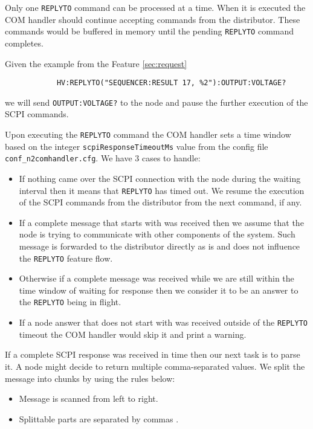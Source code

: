 \begin{itemize}
	\item Only one \texttt{REPLYTO} command can be processed at a time. When it is executed the COM handler should continue accepting commands from the distributor. These commands would be buffered in memory until the pending \texttt{REPLYTO} command completes.
	\item{
		Given the example from the Feature \ref{sec:request}
		\begin{verbatim}
			HV:REPLYTO("SEQUENCER:RESULT 17, %2"):OUTPUT:VOLTAGE?
		\end{verbatim}
		we will send \texttt{OUTPUT:VOLTAGE?} to the node and pause the further execution of the SCPI commands.
	}
	\item{
		Upon executing the \texttt{REPLYTO} command the COM handler sets a time window based on the integer \texttt{scpiResponseTimeoutMs} value from the config file \texttt{conf\_n2comhandler.cfg}. We have 3 cases to handle:
		\begin{itemize}
			\item If nothing came over the SCPI connection with the node during the waiting interval then it means that \texttt{REPLYTO} has timed out. We resume the execution of the SCPI commands from the distributor from the next command, if any.
			\item If a complete message that starts with \highlight{:} was received then we assume that the node is trying to communicate with other components of the system. Such message is forwarded to the distributor directly as is and does not influence the \texttt{REPLYTO} feature flow.
			\item Otherwise if a complete message was received while we are still within the time window of waiting for response then we consider it to be an answer to the \texttt{REPLYTO} being in flight.
			\item If a node answer that does not start with \highlight{:} was received outside of the \texttt{REPLYTO} timeout the COM handler would skip it and print a warning.
		\end{itemize}
		\item{
			If a complete SCPI response was received in time then our next task is to parse it. A node might decide to return multiple comma-separated values. We split the message into chunks by using the rules below:
			\begin{itemize}
				\item Message is scanned from left to right.
				\item Splittable parts are separated by commas \highlight{,}.

\end{itemize}}}
\end{itemize}
